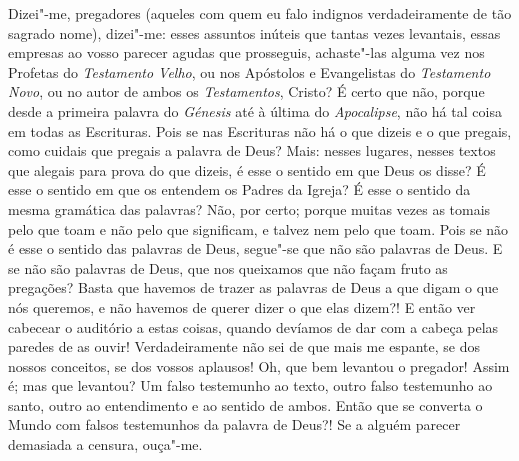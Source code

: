 Dizei"-me, pregadores (aqueles com quem eu falo indignos
verdadeiramente de tão sagrado nome), dizei"-me: esses assuntos
inúteis que tantas vezes levantais, essas empresas ao vosso parecer
agudas que prosseguis, achaste"-las alguma vez nos Profetas do
\emph{Testamento Velho}, ou nos Apóstolos e Evangelistas do
\emph{Testamento Novo}, ou no autor de ambos os \emph{Testamentos},
Cristo? É certo que não, porque desde a primeira palavra do
\emph{Génesis} até à última do \emph{Apocalipse}, não há tal coisa em
todas as Escrituras. Pois se nas Escrituras não há o que dizeis e o que
pregais, como cuidais que pregais a palavra de Deus? Mais: nesses
lugares, nesses textos que alegais para prova do que dizeis, é esse o
sentido em que Deus os disse? É esse o sentido em que os entendem os
Padres da Igreja? É esse o sentido da mesma gramática das palavras?
Não, por certo; porque muitas vezes as tomais pelo que toam e não pelo
que significam, e talvez nem pelo que toam. Pois se não é esse o
sentido das palavras de Deus, segue"-se que não são palavras de Deus. E
se não são palavras de Deus, que nos queixamos que não façam fruto as
pregações? Basta que havemos de trazer as palavras de Deus a que digam o
que nós queremos, e não havemos de querer dizer o que elas dizem?! E
então ver cabecear o auditório a estas coisas, quando devíamos de dar
com a cabeça pelas paredes de as ouvir! Verdadeiramente não sei de que
mais me espante, se dos nossos conceitos, se dos vossos aplausos! Oh,
que bem levantou o pregador! Assim é; mas que levantou? Um falso
testemunho ao texto, outro falso testemunho ao santo, outro ao
entendimento e ao sentido de ambos. Então que se converta o Mundo com
falsos testemunhos da palavra de Deus?! Se a alguém parecer demasiada a
censura, ouça"-me.


